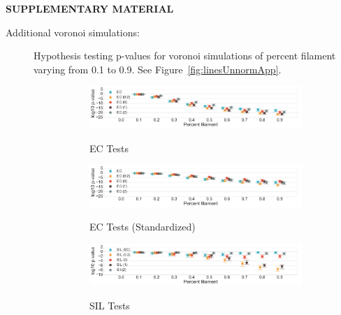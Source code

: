 \documentclass[12pt]{article}
\newcommand{\figref}[1]{Figure~\ref{#1}}
\begin{document}

\bigskip
\begin{center}
{\large\bf SUPPLEMENTARY MATERIAL}
\end{center}

\begin{description}
  \item[Additional voronoi simulations:] Hypothesis testing p-values for voronoi simulations of percent filament varying from 0.1 to 0.9. See \figref{fig:linesUnnormApp}.

  \begin{center}
    \begin{figure}[htp!]
      \centering
      \begin{subfigure}{.48\textwidth}
        \centering
        \caption{EC Tests}
        \includegraphics[width=\linewidth, height = .75in]{figure_8_all_euler_group.pdf}
        \label{fig:all_euler}
      \end{subfigure}
      \begin{subfigure}{.48\textwidth}
        \centering
        \caption{EC Tests (Standardized)}
        \includegraphics[width=\linewidth, height = .75in]{figure_8_all_euler_group_normed.pdf}
        \label{fig:all_euler_normed}
      \end{subfigure}
      \begin{subfigure}{.48\textwidth}
        \centering
        \caption{SIL Tests}
        \includegraphics[width=\linewidth, height = .75in]{figure_8_all_silhouette_group.pdf}
        \label{fig:all_silh}
      \end{subfigure}
      \begin{subfigure}{.48\textwidth}
        \centering

\end{subfigure}
\end{figure}
\end{center}
\end{description}
\end{document}
